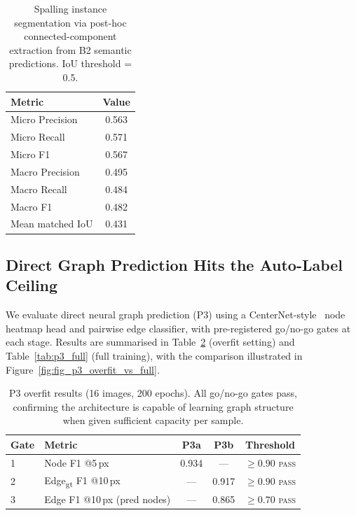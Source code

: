 \documentclass[preprint,12pt]{elsarticle}
\begin{document}
\begin{table}[t]
\centering
\caption{Spalling instance segmentation via post-hoc connected-component extraction from B2 semantic predictions. IoU threshold = 0.5.}
\label{tab:spalling_instance}
\begin{tabular}{lc}
\toprule
Metric & Value \\
\midrule
Micro Precision & 0.563 \\
Micro Recall & 0.571 \\
Micro F1 & 0.567 \\
Macro Precision & 0.495 \\
Macro Recall & 0.484 \\
Macro F1 & 0.482 \\
Mean matched IoU & 0.431 \\
\bottomrule
\end{tabular}
\end{table}


\subsection{Direct Graph Prediction Hits the Auto-Label Ceiling}
\label{sec:results_p3}

We evaluate direct neural graph prediction (P3) using a CenterNet-style~\cite{zhou2019centernet} node heatmap head and pairwise edge classifier, with pre-registered go/no-go gates at each stage. Results are summarised in Table~\ref{tab:p3_overfit} (overfit setting) and Table~\ref{tab:p3_full} (full training), with the comparison illustrated in Figure~\ref{fig:fig_p3_overfit_vs_full}.

\begin{table}[t]
\centering
\caption{P3 overfit results (16 images, 200 epochs). All go/no-go gates pass, confirming the architecture is capable of learning graph structure when given sufficient capacity per sample.}
\label{tab:p3_overfit}
\begin{tabular}{llccc}
\toprule
Gate & Metric & P3a & P3b & Threshold \\
\midrule
1 & Node F1 @5\,px & 0.934 & --- & $\geq 0.90$ \textsc{pass} \\
2 & Edge\textsubscript{gt} F1 @10\,px & --- & 0.917 & $\geq 0.90$ \textsc{pass} \\
3 & Edge F1 @10\,px (pred nodes) & --- & 0.865 & $\geq 0.70$ \textsc{pass} \\
\bottomrule
\end{tabular}
\end{table}
\end{document}
